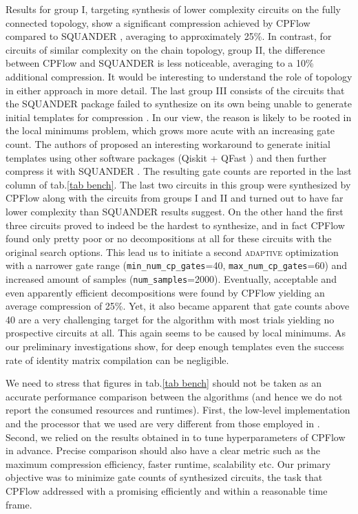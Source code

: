 \documentclass[twocolumn, amsfonts, amssymb, aps, nofootinbib]{revtex4-2}
\newcommand{\package}[1]{\textrm {#1 }}
\newcommand{\cpflow}{\package{CPFlow}}
\newcommand{\adaptive}{\textsc{adaptive }}
\newcommand{\param}[1]{\texttt{#1}}
\begin{document}
Results for group I, targeting synthesis of lower complexity circuits on the fully connected  topology, show a significant compression achieved by \cpflow compared to \package{SQUANDER}, averaging to approximately 25\%. In contrast, for circuits of similar complexity on the chain topology, group II, the difference between \package{CPFlow} and \package{SQUANDER} is less noticeable, averaging to a 10\% additional compression. It would be interesting to understand the role of topology in either approach in more detail. The last group III consists of the circuits that the \package{SQUANDER} package failed to synthesize on its own being unable to generate initial templates for compression \cite{Rakyta2022}. In our view, the reason is likely to be rooted in the local minimums problem, which grows more acute with an increasing gate count. The authors of \cite{Rakyta2022} proposed an interesting workaround to generate initial templates using other software packages (\package{Qiskit}+ \package{QFast}) and then further compress it with \package{SQUANDER}. The resulting gate counts are reported in the last column of tab.\ref{tab bench}. The last two circuits in this group were synthesized by \cpflow along with  the circuits from groups I and II and turned out to have far lower complexity than \package{SQUANDER} results suggest. On the other hand the first three circuits proved to indeed be the hardest to synthesize, and in fact \cpflow found only pretty poor or no decompositions at all for these circuits with the original search options. This lead us to initiate a second \adaptive optimization with a narrower gate range (\param{min\_num\_cp\_gates}=40, \param{max\_num\_cp\_gates}=60) and increased amount of samples (\param{num\_samples}=2000). Eventually, acceptable and even apparently efficient decompositions were found by \cpflow yielding an average compression of 25\%. Yet, it also became apparent that gate counts above 40 are a very challenging target for the algorithm with most trials yielding no prospective circuits at all. This again seems to be caused by local minimums. As our preliminary investigations show, for deep enough templates even the success rate of identity matrix compilation can be negligible. 

We need to stress that figures in tab.\ref{tab bench} should not be taken as an accurate performance comparison between the algorithms (and hence we do not report the consumed resources and runtimes). First, the low-level implementation and the processor that we used are very different from those employed in \cite{Rakyta2022}. Second, we relied on the results obtained in \cite{Rakyta2022} to tune hyperparameters of \cpflow in advance. Precise comparison should also have a clear metric such as the maximum compression efficiency, faster runtime, scalability etc. Our primary objective was to minimize gate counts of synthesized circuits, the task that \cpflow addressed with a promising efficiently and within a reasonable time frame.
\end{document}
